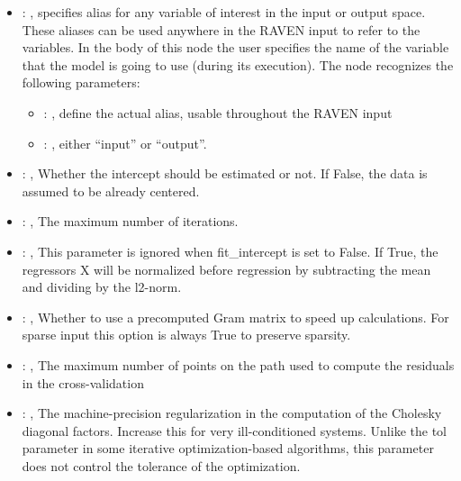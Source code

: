 \begin{itemize}
    \item {}: , 
      specifies alias for         any variable of interest in the input or output space. These
      aliases can be used anywhere in the RAVEN input to         refer to the variables. In the body
      of this node the user specifies the name of the variable that the model is going to use
      (during its execution).
      The  node recognizes the following parameters:
        \begin{itemize}
          \item {}: , 
            define the actual alias, usable throughout the RAVEN input
          \item {}: , 
            either ``input'' or ``output''.
      \end{itemize}

    \item {}: , 
      Whether the intercept should be estimated or not. If False,
      the data is assumed to be already centered.

    \item {}: , 
      The maximum number of iterations.

    \item {}: , 
      This parameter is ignored when fit\_intercept is set to False. If True,
      the regressors X will be normalized before regression by subtracting the mean and
      dividing by the l2-norm.

    \item {}: , 
      Whether to use a precomputed Gram matrix to speed up calculations.
      For sparse input this option is always True to preserve sparsity.

    \item {}: , 
      The maximum number of points on the path used to compute the residuals in
      the cross-validation

    \item {}: , 
      The machine-precision regularization in the computation of the Cholesky
      diagonal factors. Increase this for very ill-conditioned systems. Unlike the tol
      parameter in some iterative optimization-based algorithms, this parameter does not
      control the tolerance of the optimization.


\end{itemize}
